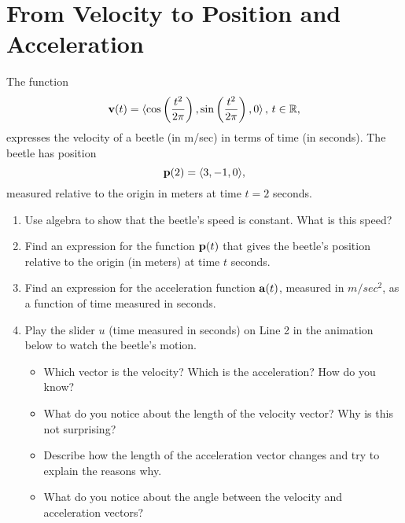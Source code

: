 \documentclass{ximera}
\begin{document}
\section{From Velocity to Position and Acceleration}
\begin{question} \label{Qder44t4tr4tr4}
The function
\[
  {\bf v}(t) = \langle \cos \left( \frac{t^2}{2\pi}  \right) ,  \sin \left( \frac{t^2}{2\pi} \right) , 0 \rangle \, , \, t \in \mathbb{R} ,
\]
expresses the velocity of a beetle (in m/sec) in terms of time (in seconds). The beetle has position
\[
   {\bf p}(2) = \langle 3, -1, 0  \rangle ,
\]
measured relative to the origin in meters at time $t=2$ seconds.

\begin{enumerate}
\item Use algebra to show that the beetle's speed is constant. What is this speed?


\item Find an expression for the function ${\bf p}(t)$ that gives the beetle's position relative to the origin (in meters) at time $t$ seconds.

\item Find an expression for the acceleration function ${\bf a}(t)$, measured in $m/sec^2$, as a function of time measured in seconds.

\item Play the slider $u$ (time measured in seconds) on Line 2 in the animation below to watch the beetle's motion.

\begin{itemize}
\item Which vector is the velocity? Which is the acceleration? How do you know?

\item What do you notice about the length of the velocity vector? Why is this not surprising?

\item Describe how the length of the acceleration vector changes and try to explain the reasons why.

\item What do you notice about the angle between the velocity and acceleration vectors?

\end{itemize}


\end{enumerate}
\end{question}
\end{document}
